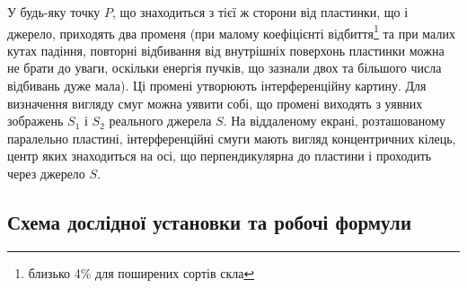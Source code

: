 У будь-яку точку  \hyperref[fig:imagesources]{$P$}, що знаходиться з тієї ж сторони від пластинки, що і джерело, приходять два променя (при малому коефіцієнті відбиття\footnote{близько 4\% для поширених сортів скла} та при малих кутах падіння, повторні відбивання від внутрішніх поверхонь пластинки можна не брати до уваги, оскільки енергія пучків, що зазнали двох та більшого числа відбивань дуже мала). Ці промені утворюють інтерференційну картину. Для визначення вигляду смуг можна уявити собі, що промені виходять з уявних зображень \hyperref[fig:imagesources]{$S_1$} і \hyperref[fig:imagesources]{$S_2$}  реального джерела \hyperref[fig:imagesources]{$S$}. На віддаленому екрані, розташованому паралельно пластині, інтерференційні смуги мають вигляд  концентричних кілець,  центр яких знаходиться на осі, що перпендикулярна до пластини і проходить через джерело \hyperref[fig:imagesources]{$S$}.

\subsection{Схема дослідної установки та робочі формули}


